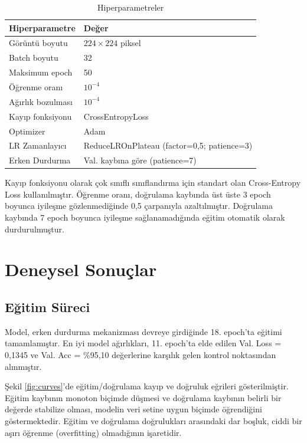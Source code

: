 \documentclass[conference]{IEEEtran}
\begin{document}
\begin{table}[h]
\caption{Hiperparametreler}
\label{tab:hyperparams}
\centering
\begin{tabular}{ll}
\toprule
\textbf{Hiperparametre} & \textbf{Değer} \\
\midrule
Görüntü boyutu      & $224 \times 224$ piksel \\
Batch boyutu        & 32 \\
Maksimum epoch      & 50 \\
Öğrenme oranı       & $10^{-4}$ \\
Ağırlık bozulması   & $10^{-4}$ \\
Kayıp fonksiyonu    & CrossEntropyLoss \\
Optimizer           & Adam \cite{kingma2014adam} \\
LR Zamanlayıcı      & ReduceLROnPlateau (factor=0,5; patience=3) \\
Erken Durdurma      & Val. kaybına göre (patience=7) \\
\bottomrule
\end{tabular}
\end{table}

Kayıp fonksiyonu olarak çok sınıflı sınıflandırma için standart olan
Cross-Entropy Loss kullanılmıştır. Öğrenme oranı, doğrulama kaybında
üst üste 3 epoch boyunca iyileşme gözlenmediğinde 0,5 çarpanıyla
azaltılmıştır. Doğrulama kaybında 7 epoch boyunca iyileşme
sağlanamadığında eğitim otomatik olarak durdurulmuştur.

\section{Deneysel Sonuçlar}

\subsection{Eğitim Süreci}

Model, erken durdurma mekanizması devreye girdiğinde 18. epoch'ta eğitimi
tamamlamıştır. En iyi model ağırlıkları, 11. epoch'ta elde edilen
Val. Loss = 0,1345 ve Val. Acc = \%95,10 değerlerine karşılık gelen
kontrol noktasından alınmıştır.

Şekil \ref{fig:curves}'de eğitim/doğrulama
kayıp ve doğruluk eğrileri gösterilmiştir. Eğitim kaybının monoton biçimde
düşmesi ve doğrulama kaybının belirli bir değerde stabilize olması, modelin
veri setine uygun biçimde öğrendiğini göstermektedir. Eğitim ve doğrulama
doğrulukları arasındaki dar boşluk, ciddi bir aşırı öğrenme (overfitting)
olmadığının işaretidir.
\end{document}
